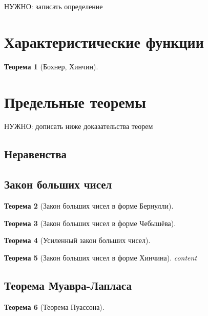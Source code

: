 \documentclass[12pt]{article}
\newtheorem{theorem}{Теорема}
\numberwithin{theorem}{section}
\numberwithin{proposition}{section}
\theoremstyle{definition}
\newcommand{\TODO}[1]{\textcolor{todocolor}{НУЖНО: #1}}
\begin{document}
	\TODO{записать определение}
	
	\section{Характеристические функции}
	
	\begin{theorem}[Бохнер, Хинчин]
		
	\end{theorem}
	
	\section{Предельные теоремы}
	
	\TODO{дописать ниже доказательства теорем}
	
	\subsection{Неравенства}
	
	\subsection{Закон больших чисел}
	
	\begin{theorem}[Закон больших чисел в форме Бернулли]
		
	\end{theorem}
	
	\begin{theorem}[Закон больших чисел в форме Чебышёва]
		
	\end{theorem}
	
	\begin{theorem}[Усиленный закон больших чисел]
		
	\end{theorem}
	
	\begin{theorem}[Закон больших чисел в форме Хинчина]
		content
	\end{theorem}
	
	\subsection{Теорема Муавра-Лапласа}
	
	\begin{theorem}[Теорема Пуассона]
		
	\end{theorem}
	
\end{document}
